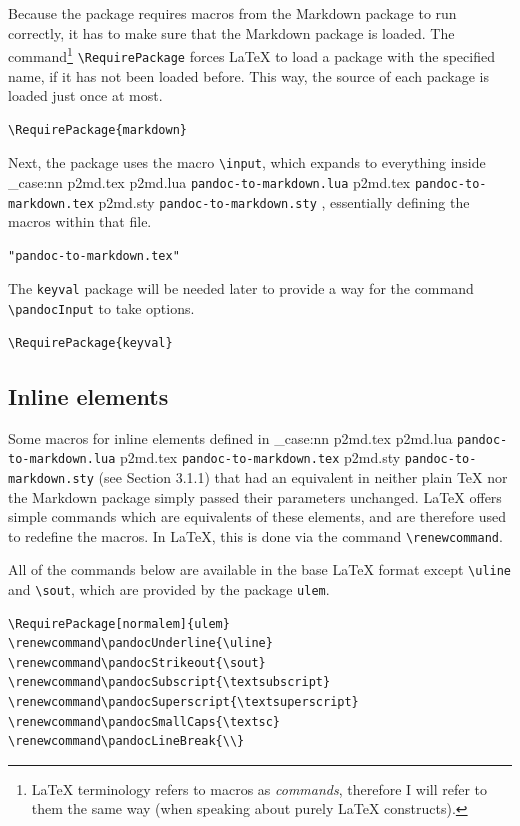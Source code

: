 \documentclass[
  digital,     %
  oneside,     %
  nosansbold,  %
  nocolorbold, %
  lof,         %
  nolot,       %
]{fithesis4}
\newcommand\macro[1]{\texttt{\textbackslash{}{#1}}}
\newcommand\file[1]
  {
    \str_case:nn
      { #1 }
      {
        { p2md.lua } { \texttt{pandoc\hyp{}to\hyp{}markdown.lua} }
        { p2md.tex } { \texttt{pandoc\hyp{}to\hyp{}markdown.tex} }
        { p2md.sty } { \texttt{pandoc\hyp{}to\hyp{}markdown.sty} }
      }
  }
\begin{document}
\noindent
Because the package requires macros from the Markdown package to run correctly, it has to make sure that the Markdown package is loaded. The command\footnote{\LaTeX{} terminology refers to macros as \emph{commands}, therefore I will refer to them the same way (when speaking about purely \LaTeX{} constructs).} \macro{RequirePackage} forces \LaTeX{} to load a package with the specified name, if it has not been loaded before. This way, the source of each package is loaded just once at most.

\noindent
\lstset{language=[LaTeX]TeX}
\begin{lstlisting}
\RequirePackage{markdown}
\end{lstlisting}

\noindent
Next, the package uses the macro \macro{input}, which expands to everything inside \file{p2md.tex}, essentially defining the macros within that file.

\noindent
\lstset{language=[LaTeX]TeX}
\begin{lstlisting}
"pandoc-to-markdown.tex"
\end{lstlisting}

\noindent
The \texttt{keyval} package will be needed later to provide a way for the command \macro{pandocInput} to take options.

\noindent
\lstset{language=[LaTeX]TeX}
\begin{lstlisting}
\RequirePackage{keyval}
\end{lstlisting}

\subsection{Inline elements}
Some macros for inline elements defined in \file{p2md.tex} (see Section 3.1.1) that had an equivalent in neither plain \TeX{} nor the Markdown package simply passed their parameters unchanged. \LaTeX{} offers simple commands which are equivalents of these elements, and are therefore used to redefine the macros. In \LaTeX{}, this is done via the command \macro{renewcommand}.

All of the commands below are available in the base \LaTeX{} format except \macro{uline} and \macro{sout}, which are provided by the package \texttt{ulem}.

\noindent
\lstset{language=[LaTeX]TeX}
\begin{lstlisting}
\RequirePackage[normalem]{ulem}
\renewcommand\pandocUnderline{\uline}
\renewcommand\pandocStrikeout{\sout}
\renewcommand\pandocSubscript{\textsubscript}
\renewcommand\pandocSuperscript{\textsuperscript}
\renewcommand\pandocSmallCaps{\textsc}
\renewcommand\pandocLineBreak{\\}
\end{lstlisting}
\end{document}
